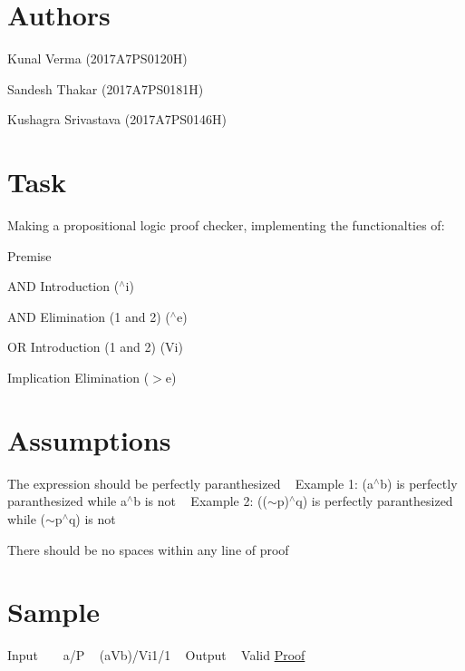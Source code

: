 \hypertarget{index_Authors}{}\section{Authors}\label{index_Authors}

\begin{DoxyEnumerate}
\item Kunal Verma (2017\+A7\+P\+S0120H)
\item Sandesh Thakar (2017\+A7\+P\+S0181H)
\item Kushagra Srivastava (2017\+A7\+P\+S0146H)
\end{DoxyEnumerate}\hypertarget{index_Task}{}\section{Task}\label{index_Task}
Making a propositional logic proof checker, implementing the functionalties of\+:
\begin{DoxyEnumerate}
\item Premise
\item A\+ND Introduction ($^\wedge$i)
\item A\+ND Elimination (1 and 2) ($^\wedge$e)
\item OR Introduction (1 and 2) (Vi)
\item Implication Elimination ($>$e)
\end{DoxyEnumerate}\hypertarget{index_Assumptions}{}\section{Assumptions}\label{index_Assumptions}

\begin{DoxyEnumerate}
\item The expression should be perfectly paranthesized ~\newline
 Example 1\+: (a$^\wedge$b) is perfectly paranthesized while a$^\wedge$b is not ~\newline
 Example 2\+: (($\sim$p)$^\wedge$q) is perfectly paranthesized while ($\sim$p$^\wedge$q) is not
\item There should be no spaces within any line of proof
\end{DoxyEnumerate}\hypertarget{index_Sample}{}\section{Sample}\label{index_Sample}
Input ~ ~\newline
 a/P ~\newline
 (a\+Vb)/\+Vi1/1 ~\newline
 Output ~\newline
 Valid \mbox{\hyperlink{class_proof}{Proof}} 